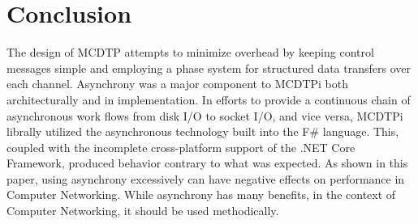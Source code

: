\chapter{Conclusion}

The design of MCDTP attempts to minimize overhead by keeping control messages simple and employing a phase system for structured data transfers over each channel. Asynchrony was a major component to MCDTPi both architecturally and in implementation. In efforts to provide a continuous chain of asynchronous work flows from disk I/O to socket I/O, and vice versa, MCDTPi librally utilized the asynchronous technology built into the F\# language. This, coupled with the incomplete cross-platform support of the .NET Core Framework, produced behavior contrary to what was expected. As shown in this paper, using asynchrony excessively can have negative effects on performance in Computer Networking. While asynchrony has many benefits, in the context of Computer Networking, it should be used methodically.